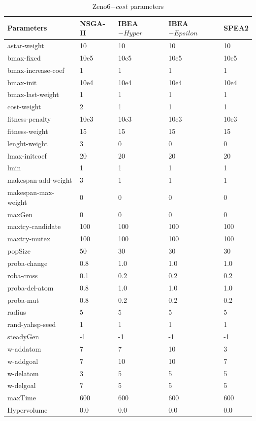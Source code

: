 \documentclass[a4paper,10pt]{article}
\begin{document}

\begin{table}[h]
\scriptsize
\begin{tabular}{|l|l|l|l|l|}

\hline
 Parameters  		&	NSGA-II 	&	IBEA$-{Hyper}$	&	IBEA$-{Epsilon}$	&	SPEA2\\
\hline
astar-weight	&	10	&	10	&	10	&	10	\\
bmax-fixed	&	10e5	&	10e5	&	10e5	&	10e5	\\
bmax-increase-coef	&	1	&	1	&	1	&	1	\\
bmax-init	&	10e4	&	10e4	&	10e4	&	10e4	\\
bmax-last-weight	&	1	&	1	&	1	&	1	\\
cost-weight	&	2	&	1	&	1	&	1	\\
fitness-penalty	&	10e3	&	10e3	&	10e3	&	10e3	\\
fitness-weight	&	15	&	15	&	15	&	15	\\
lenght-weight	&	3	&	0	&	0	&	0	\\
lmax-initcoef	&	20	&	20	&	20	&	20	\\
lmin	&	1	&	1	&	1	&	1	\\
makespan-add-weight	&	3	&	1	&	1	&	1	\\
makespan-max-weight	&	0	&	0	&	0	&	0	\\
maxGen	&	0	&	0	&	0	&	0	\\
maxtry-candidate	&	100	&	100	&	100	&	100	\\
maxtry-mutex	&	100	&	100	&	100	&	100	\\
popSize	&	50	&	30	&	30	&	30	\\
proba-change	&	0.8	&	1.0	&	1.0	&	1.0	\\
roba-cross	&	0.1	&	0.2	&	0.2	&	0.2	\\
proba-del-atom	&	0.8	&	1.0	&	1.0	&	1.0	\\
proba-mut	&	0.8	&	0.2	&	0.2	&	0.2	\\
radius	&	5	&	5	&	5	&	5	\\
rand-yahsp-seed	&	1	&	1	&	1	&	1	\\
steadyGen	&	-1	&	-1	&	-1	&	-1	\\
w-addatom	&	7	&	7	&	10	&	3	\\
w-addgoal	&	7	&	10	&	10	&	7	\\
w-delatom	&	3	&	5	&	5	&	5	\\
w-delgoal	&	7	&	5	&	5	&	5	\\
maxTime	&	600	&	600	&	600	&	600	\\
\hline
Hypervolume	&	0.0	&	0.0	&	0.0	&	0.0	\\
\hline

\end{tabular}
\caption{Zeno6$-{cost}$ parameters}
\end{table}
\end{document}
